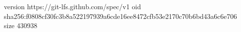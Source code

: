 version https://git-lfs.github.com/spec/v1
oid sha256:f0808cf30fc3b8a522197939a6cde16ee8472cfb53e2170c70b6bd43a6c6e706
size 430938
